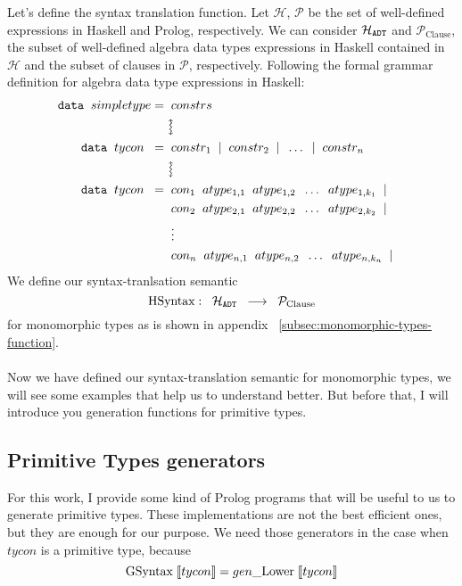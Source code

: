 Let's define the syntax translation function. Let $\mathcal{H}$, $\mathcal{P}$ be the set of well-defined expressions in Haskell and Prolog, respectively. We can consider $\mathcal{H}_{\texttt{ADT}}$ and $\mathcal{P}_{\text{Clause}}$, the subset of well-defined algebra data types expressions in Haskell contained in $\mathcal{H}$ and the subset of clauses in $\mathcal{P}$, respectively. Following the formal grammar definition for algebra data type expressions in Haskell:
\begin{align*}
	\ttt{data} \tav simpletype =  & \tav constrs                                                                       &   &   \\
	                              & \updownsquigarrow                                                                  &   &   \\
	\ttt{data} \tav tycon \tav 	= & \tav constr_1 \tav | \tav constr_2 \tav | \tav \ldots \tav | \tav constr_n         &   &   \\
	                              & \updownsquigarrow                                                                  &   &   \\
	\ttt{data} \tav tycon \tav 	= & \tav con_1 \tav atype_{1,1} \tav atype_{1,2} \tav \ldots \tav atype_{1,k_1} \tav | &   &   \\
	                              & \tav con_2 \tav atype_{2,1} \tav atype_{2,2} \tav \ldots \tav atype_{2,k_2} \tav | &   &   \\
	                              & \tav \vdots \tav                                                                   &   &   \\
	                              & \tav con_n \tav atype_{n,1} \tav atype_{n,2} \tav \ldots \tav atype_{n,k_n} \tav | &   &   \\
\end{align*}
We define our syntax-tranlsation semantic $$\text{HSyntax} :\;\; \mathcal{H}_{\texttt{ADT}} \;\; \longrightarrow \;\; \mathcal{P}_{\text{Clause}}$$ for monomorphic types as is shown in appendix ~\ref{subsec:monomorphic-types-function}.\\\\
Now we have defined our syntax-translation semantic for monomorphic types, we will see some examples that help us to understand better. But before that, I will introduce you generation functions for primitive types.
\subsection{Primitive Types generators}
For this work, I provide some kind of Prolog programs that will be useful to us to generate primitive types. These implementations are not the best efficient ones, but they are enough for our purpose. We need those generators in the case when $tycon$ is a primitive type, because $$\text{GSyntax} \; \llbracket tycon \rrbracket = gen\_\text{Lower} \; \llbracket tycon \rrbracket$$
